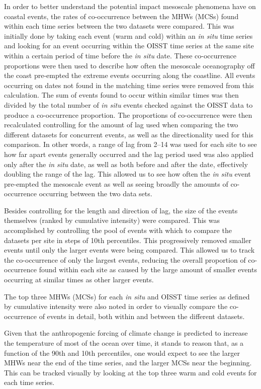 \documentclass[a4paper,10pt,review]{elsarticle}
\begin{document}
In order to better understand the potential impact mesoscale phenomena have on coastal events, the rates of co-occurrence between the MHWs (MCSs) found within each time series between the two datasets were compared. This was initially done by taking each event (warm and cold) within an \emph{in situ} time series and looking for an event occurring within the OISST time series at the same site within a certain period of time before the \emph{in situ} date. These co-occurrence proportions were then used to describe how often the mesoscale oceanography off the coast pre-empted the extreme events occurring along the coastline. All events occurring on dates not found in the matching time series were removed from this calculation. The sum of events found to occur within similar times was then divided by the total number of \emph{in situ} events checked against the OISST data to produce a co-occurrence proportion. The proportions of co-occurrence were then recalculated controlling for the amount of lag used when comparing the two different datasets for concurrent events, as well as the directionality used for this comparison. In other words, a range of lag from 2--14 was used for each site to see how far apart events generally occurred and the lag period used was also applied only after the \emph{in situ} date, as well as both before and after the date, effectively doubling the range of the lag. This allowed us to see how often the \emph{in situ} event pre-empted the mesoscale event as well as seeing broadly the amounts of co-occurrence occurring between the two data sets.

Besides controlling for the length and direction of lag, the size of the events themselves (ranked by cumulative intensity) were compared. This was accomplished by controlling the pool of events with which to compare the datasets per site in steps of 10th percentiles. This progressively removed smaller events until only the larger events were being compared. This allowed us to track the co-occurrence of only the largest events, reducing the overall proportion of co-occurrence found within each site as caused by the large amount of smaller events occurring at similar times as other larger events.

The top three MHWs (MCSs) for each \emph{in situ} and OISST time series as defined by cumulative intensity were also noted in order to visually compare the co-occurrence of events in detail, both within and between the different datasets.

Given that the anthropogenic forcing of climate change is predicted to increase the temperature of most of the ocean over time, it stands to reason that, as a function of the 90th and 10th percentiles, one would expect to see the larger MHWs near the end of the time series, and the larger MCSs near the beginning.  This can be tracked visually by looking at the top three warm and cold events for each time series.
\end{document}
